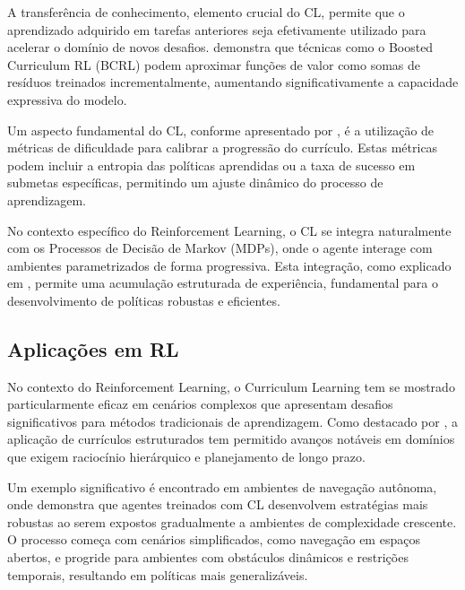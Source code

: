 A transferência de conhecimento, elemento crucial do CL, permite que o aprendizado adquirido em tarefas anteriores seja efetivamente utilizado para acelerar o domínio de novos desafios. \cite{https://openreview.net/forum?id=yRhrVaDOWE} demonstra que técnicas como o Boosted Curriculum RL (BCRL) podem aproximar funções de valor como somas de resíduos treinados incrementalmente, aumentando significativamente a capacidade expressiva do modelo.

Um aspecto fundamental do CL, conforme apresentado por \cite{https://zilliz.com/ai-faq/what-is-curriculum-learning-in-reinforcement-learning}, é a utilização de métricas de dificuldade para calibrar a progressão do currículo. Estas métricas podem incluir a entropia das políticas aprendidas ou a taxa de sucesso em submetas específicas, permitindo um ajuste dinâmico do processo de aprendizagem.

No contexto específico do Reinforcement Learning, o CL se integra naturalmente com os Processos de Decisão de Markov (MDPs), onde o agente interage com ambientes parametrizados de forma progressiva. Esta integração, como explicado em \cite{https://repositories.lib.utexas.edu/items/d6530e2e-35e5-452e-972c-8b3bb1dea93b}, permite uma acumulação estruturada de experiência, fundamental para o desenvolvimento de políticas robustas e eficientes.

\subsection{Aplicações em RL}
\label{subsec:curriculum_rl}

No contexto do Reinforcement Learning, o Curriculum Learning tem se mostrado particularmente eficaz em cenários complexos que apresentam desafios significativos para métodos tradicionais de aprendizagem. Como destacado por \cite{https://lilianweng.github.io/posts/2020-01-29-curriculum-rl/}, a aplicação de currículos estruturados tem permitido avanços notáveis em domínios que exigem raciocínio hierárquico e planejamento de longo prazo.

Um exemplo significativo é encontrado em ambientes de navegação autônoma, onde \cite{https://huggingface.co/learn/deep-rl-course/unitbonus3/curriculum-learning} demonstra que agentes treinados com CL desenvolvem estratégias mais robustas ao serem expostos gradualmente a ambientes de complexidade crescente. O processo começa com cenários simplificados, como navegação em espaços abertos, e progride para ambientes com obstáculos dinâmicos e restrições temporais, resultando em políticas mais generalizáveis.

